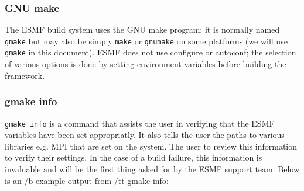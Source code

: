 \subsubsection{GNU make}
The ESMF build system uses the GNU make program; it is normally named 
{\tt gmake} but may also be simply {\tt make} or {\tt gnumake} on some 
platforms (we will use {\tt gmake} in this document). ESMF does not use
configure or autoconf;  the selection of various options is done by
setting environment variables before building the framework. 


\subsubsection{gmake info}
{\tt gmake info} is a command that assists the user in verifying that the ESMF 
variables have been set appropriatly. It also tells the user the paths to 
various libraries e.g. MPI that are set on the system. The user to review 
this information to verify their settings. In the case of a build failure, 
this information is invaluable and will be the first thing asked for by the
ESMF support team. Below is an {/b example output} from {/tt gmake info}: 
 
